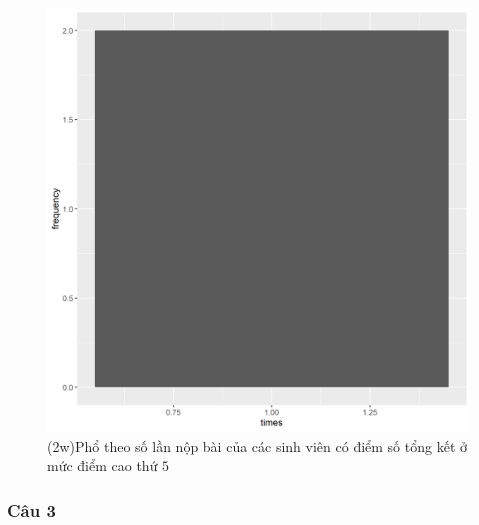 \documentclass[a4paper]{article}
\theoremstyle{definition}
\begin{document}
\begin{figure}[!ht]
    \centering
    \includegraphics[scale=0.4]{Pics/q2w-5-file4.png}
    \caption{(2w)Phổ theo số lần nộp bài của các sinh viên có điểm số tổng kết ở mức điểm cao thứ $5$}
    \label{fig:my_label}
\end{figure}
\newpage
\subsubsection{Câu 3}
\end{document}
